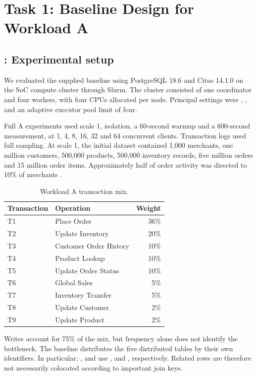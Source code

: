 \section{Task 1: Baseline Design for Workload A}
\label{sec:baseline-a}

\subsection{: Experimental setup}
We evaluated the supplied baseline using PostgreSQL 18.6 and Citus 14.1.0 on
the SoC compute cluster through Slurm. The cluster consisted of one coordinator
and four workers, with four CPUs allocated per node. Principal settings were
, , and an adaptive executor
pool limit of four.

Full A experiments used scale 1,  isolation, a 60-second
warmup and a 600-second measurement, at 1, 4, 8, 16, 32 and 64 concurrent clients.
Transaction logs used full sampling. At scale 1, the initial dataset contained
1,000 merchants, one million customers, 500,000 products, 500,000 inventory
records, five million orders and 15 million order items. Approximately half
of order activity was directed to 10\% of merchants \citep{project-brief}.

\begin{table}[htbp]
\caption{Workload A transaction mix.}
\label{tab:a-mix}
\begin{tabularx}{\linewidth}{@{}lYr@{}}
\toprule
\textbf{Transaction} & \textbf{Operation} & \textbf{Weight} \\
\midrule
T1 & Place Order & 36\% \\
T2 & Update Inventory & 20\% \\
T3 & Customer Order History & 10\% \\
T4 & Product Lookup & 10\% \\
T5 & Update Order Status & 10\% \\
T6 & Global Sales & 5\% \\
T7 & Inventory Transfer & 5\% \\
T8 & Update Customer & 2\% \\
T9 & Update Product & 2\% \\
\bottomrule
\end{tabularx}
\end{table}

Writes account for 75\% of the mix, but frequency alone does not identify the
bottleneck. The baseline distributes the five distributed tables by their own
identifiers. In particular, ,  and
 use ,  and
, respectively. Related rows are therefore not necessarily
colocated according to important join keys.

